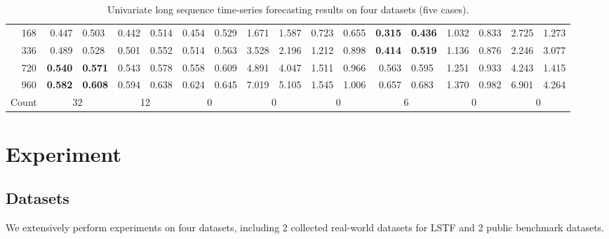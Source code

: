 \documentclass[letterpaper]{article} %
\begin{document}
\begin{table}[t]
\begin{tabular}{c|c|c|c|c|c|c|c|c|c}
	 & 	168	 & 	0.447~~0.503	 & 	0.442~~0.514	 & 	0.454~~0.529	 & 	1.671~~1.587	 & 	0.723~~0.655	 & 	\textbf{0.315}~~\textbf{0.436}	 & 	1.032~~0.833	 & 	2.725~~1.273\\
	 & 	336	 & 	0.489~~0.528	 & 	0.501~~0.552	 & 	0.514~~0.563	 & 	3.528~~2.196	 & 	1.212~~0.898	 & 	\textbf{0.414}~~\textbf{0.519}	 & 	1.136~~0.876	 & 	2.246~~3.077\\
	 & 	720	 & 	\textbf{0.540}~~\textbf{0.571}	 & 	0.543~~0.578	 & 	0.558~~0.609	 & 	4.891~~4.047	 & 	1.511~~0.966	 & 	0.563~~0.595	 & 	1.251~~0.933	 & 	4.243~~1.415\\
	 & 	960	 & 	\textbf{0.582}~~\textbf{0.608}	 & 	0.594~~0.638	 & 	0.624~~0.645	 & 	7.019~~5.105	 & 	1.545~~1.006	 & 	0.657~~0.683	 & 	1.370~~0.982	 & 	6.901~~4.264\\

\midrule[1.0pt]
\multicolumn{2}{c|}{Count}           & {32}                 & {12}                          & {0}        & {0}        & {0}     & {6}           & {0}     & {0}      \\
\bottomrule[1.0pt]

\end{tabular}
\caption{Univariate long sequence time-series forecasting results on four datasets (five cases).}
\label{tab:exp.mainResults}
\end{table}

\section{Experiment}
\label{sec:exp}


\subsection{Datasets}
We extensively perform experiments on four datasets, including 2 collected real-world datasets for LSTF and 2 public benchmark datasets.
\end{document}
